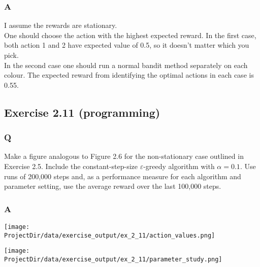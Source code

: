 \subsubsection*{A}
I assume the rewards are stationary.\\

One should choose the action with the highest expected reward. In the first case, both action 1 and 2 have expected value of 0.5, so it doesn't matter which you pick.\\

In the second case one should run a normal bandit method separately on each colour. The expected reward from identifying the optimal actions in each case is 0.55.

\subsection{Exercise 2.11 (programming)}
\subsubsection*{Q}
Make a figure analogous to Figure 2.6 for the non-stationary case outlined in Exercise 2.5. Include the constant-step-size $\varepsilon$-greedy algorithm with $\alpha=0.1$. Use runs of 200,000 steps and, as a performance measure for each algorithm and parameter setting, use the average reward over the last 100,000 steps.

\subsubsection*{A}
\ProgrammingExercise

\texttt{[image: \\ProjectDir/data/exercise\_output/ex\_2\_11/action\_values.png]}

\texttt{[image: \\ProjectDir/data/exercise\_output/ex\_2\_11/parameter\_study.png]}

